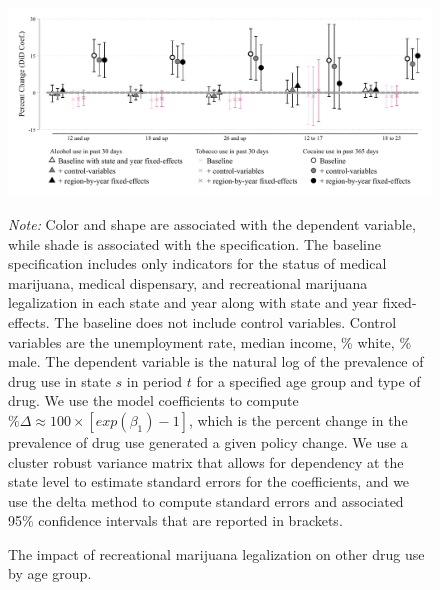 \documentclass[12pt]{article}%
\begin{document}
\begin{figure}[h]
    \caption{The impact of recreational marijuana legalization on other drug use by age group.}
        \begin{minipage}{\linewidth}
      \includegraphics[width=\linewidth]{../output/plots/aux_figure_for_paper_robust_part_a.pdf}
       \label{fig:aux_coef_plot}
        \vspace{-1cm}
     \begin{justify}
                {\footnotesize
                    \emph{Note:} 
        Color and shape are associated with the dependent variable, while shade is associated with the specification.
       The baseline specification includes only indicators for the status of medical marijuana, medical dispensary, and recreational marijuana legalization in each state and year along with state and year fixed-effects.
       The baseline does not include control variables.
       Control variables are the unemployment rate, median income, \% white, \% male. 
       The dependent variable is the natural log of the prevalence of drug use in state $s$ in period $t$ for a specified age group and type of drug. We use the model coefficients to compute $\% \Delta \approx 100\times \left[exp(\beta_1)-1\right]$, which is the percent change in the prevalence of drug use generated a given policy change.  We use a cluster robust variance matrix that allows for dependency at the state level to estimate standard errors for the coefficients, and we use the delta method to compute standard errors and associated 95\% confidence intervals that are reported in brackets. 
                \par}
            \end{justify}
    \end{minipage}
    \end{figure}
\end{document}
